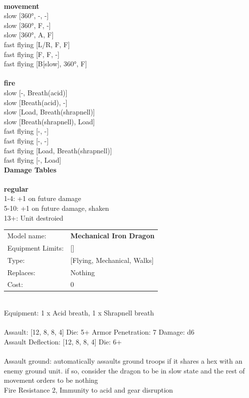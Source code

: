 \noindent 

\ \\ {\bf movement } \\
slow [360°, -, -] \\
slow [360°, F, -] \\
slow [360°, A, F] \\
fast flying [L/R, F, F] \\
fast flying [F, F, -] \\
fast flying [B[slow], 360°, F] \\
\ \\ {\bf fire } \\
slow [-, Breath(acid)] \\
slow [Breath(acid), -] \\
slow [Load, Breath(shrapnell)] \\
slow [Breath(shrapnell), Load] \\
fast flying [-, -] \\
fast flying [-, -] \\
fast flying [Load, Breath(shrapnell)] \\
fast flying [-, Load] \\


{\bf Damage Tables} \\
\ \\ {\bf regular } \\
1-4: +1 on future damage \\
5-10: +1 on future damage, shaken \\
13+: Unit destroied \\


\noindent
\begin{tabular}{ll}
Model name: &{\bf Mechanical Iron Dragon } \\
Equipment Limits: &[] \\
Type: &[Flying, Mechanical, Walks] \\
Replaces: &Nothing \\
Cost: & 0\\
\end{tabular}
\ \\
Equipment: 1 x Acid breath, 1 x Shrapnell breath \\
\ \\
Assault: [12, 8, 8, 4] Die: 5+ Armor Penetration: 7 Damage: d6 \\
Assault Deflection: [12, 8, 8, 4] Die: 6+\\
\indent  
\ \\
Assault ground: automatically assaults ground troops if it shares a hex with an enemy ground unit. if so, consider the dragon to be in slow state and the rest of movement orders to be nothing\\ 
Fire Resistance 2, Immunity to acid and gear disruption\\ 


